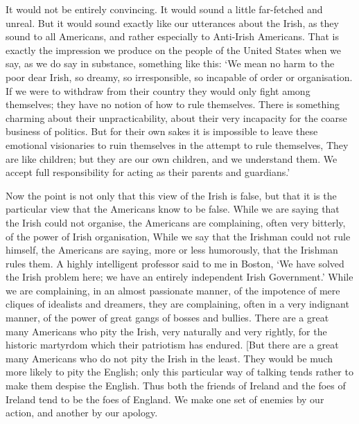 \documentclass{book}
\begin{document}
It would not be entirely convincing. It would sound a little far-fetched and unreal. But it would sound exactly like our utterances about the Irish, as they sound to all Americans, and rather especially to Anti-Irish Americans. That is exactly the impression we produce on the people of the United States when we say, as we do say in substance, something like this: ‘We mean no harm to the poor dear Irish, so dreamy, so irresponsible, so incapable of order or organisation. If we were to withdraw from their country they would only fight among themselves; they have no notion of how to rule themselves. There is something charming about their unpracticability, about their very incapacity for the coarse business of politics. But for their own sakes it is impossible to leave these emotional visionaries to ruin themselves in the attempt to rule themselves, They are like children; but they are our own children, and we understand them. We accept full responsibility for acting as their parents and guardians.’

Now the point is not only that this view of the Irish is false, but that it is the particular view that the Americans know to be false. While we are saying that the Irish could not organise, the Americans are complaining, often very bitterly, of the power of Irish organisation, While we say that the Irishman could not rule himself, the Americans are saying, more or less humorously, that the Irishman rules them. A highly intelligent professor said to me in Boston, ‘We have solved the Irish problem here; we have an entirely independent Irish Government.’ While we are complaining, in an almost passionate manner, of the impotence of mere cliques of idealists and dreamers, they are complaining, often in a very indignant manner, of the power of great gangs of bosses and bullies. There are a great many Americans who pity the Irish, very naturally and very rightly, for the historic martyrdom which their patriotism has endured. {[}But there are a great many Americans who do not pity the Irish in the least. They would be much more likely to pity the English; only this particular way of talking tends rather to make them despise the English. Thus both the friends of Ireland and the foes of Ireland tend to be the foes of England. We make one set of enemies by our action, and another by our apology.
\end{document}
